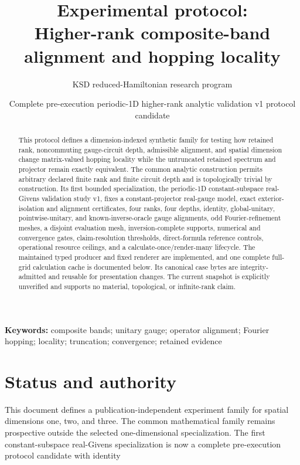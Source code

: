 \documentclass[11pt]{article}
\title{\textbf{Experimental protocol:\\
Higher-rank composite-band alignment and hopping locality}}
\author{KSD reduced-Hamiltonian research program}
\date{Complete pre-execution periodic-1D higher-rank analytic validation v1 protocol candidate}
\begin{document}
\maketitle

\begin{abstract}
This protocol defines a dimension-indexed synthetic family for testing how retained
rank, noncommuting gauge-circuit depth, admissible alignment, and spatial dimension
change matrix-valued hopping locality while the untruncated retained spectrum and
projector remain exactly equivalent. The common analytic construction permits arbitrary
declared finite rank and finite circuit depth and is topologically trivial by
construction. Its first bounded specialization, the periodic-1D constant-subspace real-Givens validation study v1, fixes a constant-projector
real-gauge model, exact exterior-isolation and alignment certificates, four ranks, four
depths, identity, global-unitary, pointwise-unitary, and known-inverse-oracle gauge
alignments, odd Fourier-refinement meshes, a disjoint evaluation
mesh, inversion-complete supports, numerical and convergence gates, claim-resolution
thresholds, direct-formula reference controls, operational resource ceilings, and a
calculate-once/render-many lifecycle. The maintained typed producer and fixed renderer
are implemented, and one complete full-grid calculation cache is documented below. Its
canonical case bytes are integrity-admitted and reusable for presentation changes. The
current snapshot is explicitly unverified and supports no material, topological, or
infinite-rank claim.
\end{abstract}

\noindent\textbf{Keywords:} composite bands; unitary gauge; operator alignment;
Fourier hopping; locality; truncation; convergence; retained evidence


\section{Status and authority}

This document defines a publication-independent experiment family for spatial dimensions
one, two, and three. The common mathematical family remains prospective outside the
selected one-dimensional specialization. The first constant-subspace real-Givens specialization is now a
complete pre-execution protocol candidate with identity

\begin{quote}\small
{}\par
\end{quote}
\end{document}
